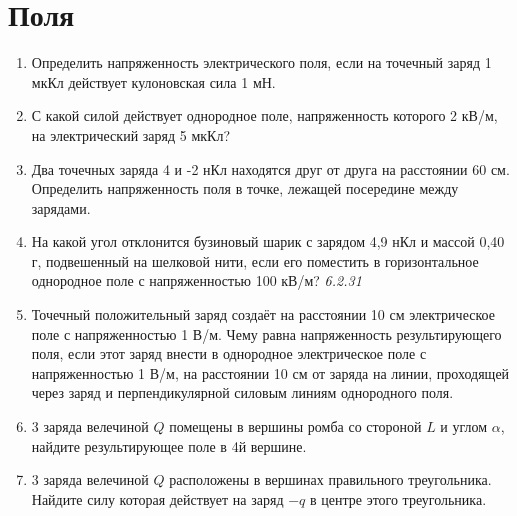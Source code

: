 \documentclass[a4paper,12pt]{article} %
\begin{document}
\section{Поля}
\begin{enumerate}






	\item Определить напряженность электрического поля, если на точечный заряд 1 мкКл действует кулоновская сила 1 мН.

	\item С какой силой действует однородное поле, напряженность которого 2 кВ/м, на электрический заряд 5 мкКл?

	\item Два точечных заряда 4 и -2 нКл находятся друг от друга на расстоянии 60 см. Определить напряженность поля в точке, лежащей посередине между зарядами.

	\item На какой угол отклонится бузиновый шарик с зарядом 4,9 нКл и массой 0,40 г, подвешенный на шелковой нити, если его поместить в горизонтальное однородное поле с напряженностью 100 кВ/м? \textit{6.2.31}

	\item  Точечный положительный заряд создаёт на расстоянии 10 см электрическое поле с напряженностью 1 В/м. Чему равна напряженность результирующего поля, если этот заряд внести в однородное электрическое поле с напряженностью 1 В/м, на расстоянии 10 см от заряда на линии, проходящей через заряд и перпендикулярной силовым линиям однородного поля.

	\item 3 заряда  велечиной $ Q $ помещены в вершины ромба со стороной $ L $ и  углом $ \alpha $, найдите результирующее поле в 4й вершине.

	\item 3 заряда велечиной $ Q $ расположены в вершинах правильного треугольника. Найдите силу которая действует на заряд $ -q  $ в центре этого треугольника. 
 


\end{enumerate}
\end{document}
